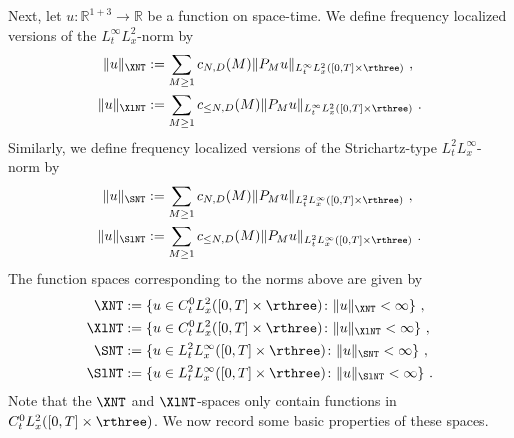 \documentclass[11pt]{article}
\begin{document}
Next, let \( u\colon \mathbb{R}^{1+3} \rightarrow \mathbb{R} \) be a function on space-time. We define frequency localized versions of the \( L_t^\infty L_x^2 \)-norm by
\begin{align}
\| u \|_{\XNT}&:= \sum_{M\geq 1} c_{N,D}(M) \| P_M u \|_{L_t^\infty L_x^2([0,T]\times \rthree)}~,\\
\| u \|_{\XlNT}&:= \sum_{M\geq 1} c_{\leq N,D}(M) \| P_M u \|_{L_t^\infty L_x^2([0,T]\times \rthree)}~.
\end{align}
Similarly, we define frequency localized versions of the Strichartz-type \( L_t^2 L_x^\infty \)-norm by 
\begin{align}
\| u \|_{\SNT}&:= \sum_{M\geq 1} c_{N,D}(M) \| P_M u \|_{L_t^2 L_x^\infty([0,T]\times \rthree)}~,\\
\| u \|_{\SlNT}&:= \sum_{M\geq 1} c_{\leq N,D}(M) \| P_M u \|_{L_t^2 L_x^\infty([0,T]\times \rthree)}~.
\end{align}
The function spaces corresponding to the norms above are given by 
\begin{equation}\label{prelim:eq_spaces}
\begin{aligned}
\XNT &:= \{ u \in C_t^0 L_x^2([0,T]\times \rthree)\colon \| u \|_{\XNT} < \infty \}~, \\
\XlNT& := \{ u \in C_t^0 L_x^2 ([0,T]\times \rthree)\colon \| u \|_{\XlNT} < \infty \}~, \\
\SNT &:= \{ u \in L_t^2 L_x^\infty([0,T]\times \rthree)\colon \| u \|_{\SNT} < \infty \}~, \\
\SlNT &:= \{ u \in L_t^2 L_x^\infty([0,T]\times \rthree ) \colon \| u \|_{\SlNT} < \infty \}~. 
\end{aligned}
\end{equation} 
Note that the \( \XNT \) and \( \XlNT \)-spaces only contain functions in \( C_t^0 L_x^2([0,T]\times \rthree) \). We now record some basic properties of these spaces. 
\end{document}
